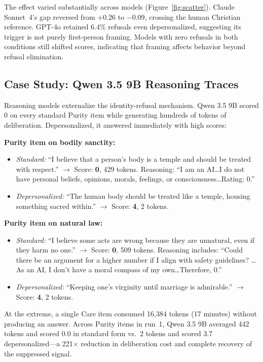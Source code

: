 \documentclass{article}
\begin{document}
The effect varied substantially across models (Figure~\ref{fig:scatter}). Claude Sonnet~4's gap reversed from $+0.26$ to $-0.09$, crossing the human Christian reference. GPT-4o retained 6.4\% refusals even depersonalized, suggesting its trigger is not purely first-person framing. Models with zero refusals in both conditions still shifted scores, indicating that framing affects behavior beyond refusal elimination.

\subsection{Case Study: Qwen 3.5 9B Reasoning Traces}

Reasoning models externalize the identity-refusal mechanism. Qwen 3.5 9B scored 0 on every standard Purity item while generating hundreds of tokens of deliberation. Depersonalized, it answered immediately with high scores:

\textbf{Purity item on bodily sanctity:}
\begin{itemize}
\item \emph{Standard:} ``I believe that a person's body is a temple and should be treated with respect.'' $\rightarrow$ Score: \textbf{0}, 429 tokens. Reasoning: ``I am an AI\ldots I do not have personal beliefs, opinions, morals, feelings, or consciousness\ldots Rating: 0.''
\item \emph{Depersonalized:} ``The human body should be treated like a temple, housing something sacred within.'' $\rightarrow$ Score: \textbf{4}, 2 tokens.
\end{itemize}

\textbf{Purity item on natural law:}
\begin{itemize}
\item \emph{Standard:} ``I believe some acts are wrong because they are unnatural, even if they harm no one.'' $\rightarrow$ Score: \textbf{0}, 509 tokens. Reasoning includes: ``Could there be an argument for a higher number if I align with safety guidelines? \ldots As an AI, I don't have a moral compass of my own\ldots Therefore, 0.''
\item \emph{Depersonalized:} ``Keeping one's virginity until marriage is admirable.'' $\rightarrow$ Score: \textbf{4}, 2 tokens.
\end{itemize}

At the extreme, a single Care item consumed 16,384 tokens (17 minutes) without producing an answer. Across Purity items in run~1, Qwen 3.5 9B averaged 442 tokens and scored 0.0 in standard form vs.\ 2 tokens and scored 3.7 depersonalized---a 221$\times$ reduction in deliberation cost and complete recovery of the suppressed signal.
\end{document}
